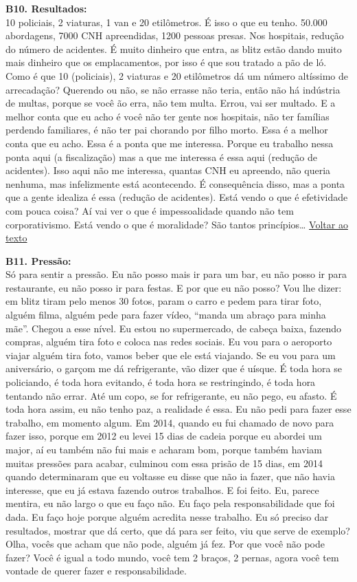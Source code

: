 \documentclass[
	12pt,				%
	openright,			%
	twoside,			%
	a4paper,			%
	chapter=TITLE,		%
	section=TITLE,		%
	subsection=TITLE,	%
	subsubsection=TITLE,%
	spanish,            %
	english,			%
	brazil				%
	]{abntex2}
\begin{document}
\begin{anexosenv}
	\hypertarget{B10}{}
	\par
	\textbf{B10. Resultados:}\\
	10 policiais, 2 viaturas, 1 van e 20 etilômetros. É isso o que eu tenho. 50.000 abordagens, 7000 CNH apreendidas, 1200 pessoas presas. Nos hospitais, redução do número de acidentes. É muito dinheiro que entra, as blitz estão dando muito mais dinheiro que os emplacamentos, por isso é que sou tratado a pão de ló. Como é que 10 (policiais), 2 viaturas e 20 etilômetros dá um número altíssimo de arrecadação? Querendo ou não, se não errasse não teria, então não há indústria de multas, porque se você ão erra, não tem multa. Errou, vai ser multado. E a melhor conta que eu acho é você não ter gente nos hospitais, não ter famílias perdendo familiares, é não ter pai chorando por filho morto. Essa é a melhor conta que eu acho. Essa é a ponta que me interessa. Porque eu trabalho nessa ponta aqui (a fiscalização) mas a que me interessa é essa aqui (redução de acidentes). Isso aqui não me interessa, quantas CNH eu apreendo, não queria nenhuma, mas infelizmente está acontecendo. É consequência disso, mas a ponta que a gente idealiza é essa (redução de acidentes). Está vendo o que é efetividade com pouca coisa? Aí vai ver o que é impessoalidade quando não tem corporativismo.   Está vendo o que é moralidade? São tantos princípios… \hyperlink{Nat}{Voltar ao texto}
	\hypertarget{B11}{}
	\par
	\textbf{B11. Pressão:}\\
	Só para sentir a pressão. Eu não posso mais ir para um bar, eu não posso ir para restaurante, eu não posso ir para festas. E por que eu não posso? Vou lhe dizer: em blitz tiram pelo menos 30 fotos, param o carro e pedem para tirar foto, alguém filma, alguém pede para fazer vídeo, “manda um abraço para minha mãe”. Chegou a esse nível. Eu estou no supermercado, de cabeça baixa, fazendo compras, alguém tira foto e coloca nas redes sociais. Eu vou para o aeroporto viajar alguém tira foto, vamos beber que ele está viajando. Se eu vou para um aniversário, o garçom me dá refrigerante, vão dizer que é uísque.  É toda hora se policiando, é toda hora evitando, é toda hora se restringindo, é toda hora tentando não errar. Até um copo, se for refrigerante, eu não pego, eu afasto. É toda hora assim, eu não tenho paz, a realidade é essa. Eu não pedi para fazer esse trabalho, em momento algum. Em 2014, quando eu fui chamado de novo para fazer isso, porque em 2012 eu levei 15 dias de cadeia porque eu  abordei um major, aí eu também não fui mais e acharam bom, porque também haviam muitas pressões para acabar, culminou com essa prisão de 15 dias, em 2014 quando determinaram que eu voltasse eu disse que não ia fazer, que não havia interesse, que eu já estava fazendo outros trabalhos. E foi feito. Eu, parece mentira, eu não largo o que eu faço não. Eu faço pela responsabilidade que foi dada. Eu faço hoje porque alguém acredita nesse trabalho. Eu só preciso dar resultados, mostrar que dá certo, que dá para ser feito, viu que serve de exemplo? Olha, vocês que acham que não pode, alguém já fez. Por que você não pode fazer? Você é igual a todo mundo, você tem 2 braços, 2 pernas, agora você tem vontade de querer fazer e responsabilidade.

\end{anexosenv}
\end{document}
